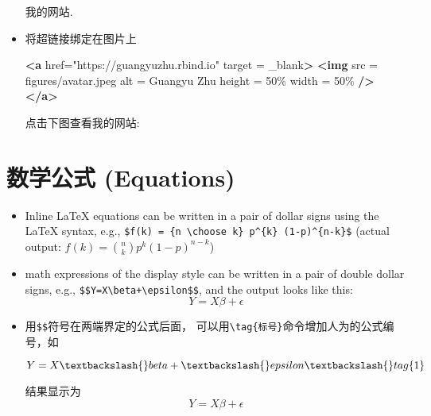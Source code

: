\documentclass[]{ctexbook}
\newenvironment{Shaded}{\begin{snugshade}}{\end{snugshade}}
\newcommand{\KeywordTok}[1]{\textcolor[rgb]{0.13,0.29,0.53}{\textbf{#1}}}
\newcommand{\NormalTok}[1]{#1}
\newcommand{\OtherTok}[1]{\textcolor[rgb]{0.56,0.35,0.01}{#1}}
\newcommand{\StringTok}[1]{\textcolor[rgb]{0.31,0.60,0.02}{#1}}
\begin{document}
\begin{itemize}
  我的网站.
\item
  将超链接绑定在图片上

\begin{Shaded}
\begin{Highlighting}[]
\KeywordTok{\textless{}a}\OtherTok{ href=}\StringTok{"https://guangyuzhu.rbind.io"}\OtherTok{ target} \OtherTok{=} \StringTok{\textquotesingle{}\_blank\textquotesingle{}}\KeywordTok{\textgreater{}}
\KeywordTok{\textless{}img}\OtherTok{ src} \OtherTok{=} \StringTok{\textquotesingle{}figures/avatar.jpeg\textquotesingle{}}\OtherTok{ alt} \OtherTok{=} \StringTok{\textquotesingle{}Guangyu Zhu\textquotesingle{}}\OtherTok{ height} \OtherTok{=} \StringTok{50\%}\OtherTok{ width} \OtherTok{=} \StringTok{50\%} \KeywordTok{/\textgreater{}}
\KeywordTok{\textless{}/a\textgreater{}}
\end{Highlighting}
\end{Shaded}

  点击下图查看我的网站:
\end{itemize}

\hypertarget{markdown-math}{%
\section{数学公式 (Equations)}\label{markdown-math}}

\begin{itemize}
\item
  Inline LaTeX equations can be written in a pair of dollar signs using the LaTeX syntax, e.g., \texttt{\$f(k)\ =\ \{n\ \textbackslash{}choose\ k\}\ p\^{}\{k\}\ (1-p)\^{}\{n-k\}\$} (actual output: \(f(k) = {n \choose k} p^{k} (1-p)^{n-k}\))
\item
  math expressions of the display style can be written in a pair of double dollar signs, e.g., \texttt{\$\$Y=X\textbackslash{}beta+\textbackslash{}epsilon\$\$}, and the output looks like this:
  \[Y=X\beta+\epsilon\]
\item
  用\texttt{\$\$}符号在两端界定的公式后面， 可以用\texttt{\textbackslash{}tag\{标号\}}命令增加人为的公式编号，如

\begin{Shaded}
\begin{Highlighting}[]
\NormalTok{$$}
\NormalTok{Y=X\textbackslash{}beta+\textbackslash{}epsilon \textbackslash{}tag\{1\}}
\NormalTok{$$}
\end{Highlighting}
\end{Shaded}

  结果显示为
  \[
  Y=X\beta+\epsilon \tag{1}
  \]
\end{itemize}
\end{document}

